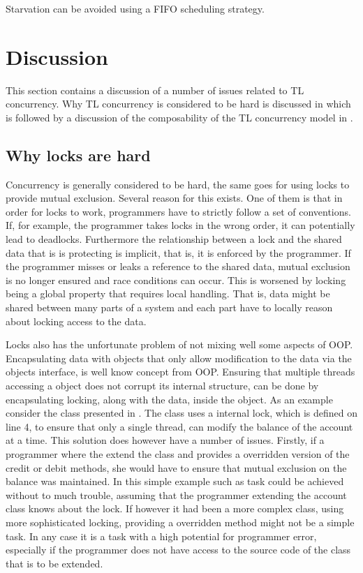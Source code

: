 Starvation can be avoided using a \ac{FIFO} scheduling strategy\cite[p. 459]{tanenbaum2008modern}.

\section{Discussion}
This section contains a discussion of a number of issues related to \ac{TL} concurrency. Why \ac{TL} concurrency is considered to be hard is discussed in  which is followed by a discussion of the composability of the \ac{TL} concurrency model in .
\subsection{Why locks are hard}\label{subsec:tl_lock_hard}
Concurrency is generally considered to be hard, the same goes for using locks to provide mutual exclusion\cite[p. 56]{sutter2005software}. Several reason for this exists. One of them is that in order for locks to work, programmers have to strictly follow a set of conventions. If, for example, the programmer takes locks in the wrong order, it can potentially lead to deadlocks\cite[p. 58]{sutter2005software}. Furthermore the relationship between a lock and the shared data that is is protecting is implicit, that is, it is enforced by the programmer. If the programmer misses or leaks a reference to the shared data, mutual exclusion is no longer ensured and race conditions can occur. This is worsened by locking being a global property that requires local handling. That is, data might be shared between many parts of a system and each part have to locally reason about locking access to the data.

Locks also has the unfortunate problem of not mixing well some aspects of \ac{OOP}. Encapsulating data with objects that only allow modification to the data via the objects interface, is well know concept from \ac{OOP}. Ensuring that multiple threads accessing a object does not corrupt its internal structure, can be done by encapsulating locking, along with the data, inside the object. As an example consider the  class presented in . The  class uses a internal lock, which is defined on line 4, to ensure that only a single thread, can modify the balance of the account at a time. This solution does however have a number of issues. Firstly, if a programmer where the extend the  class and provides a overridden version of the credit or debit methods, she would have to ensure that mutual exclusion on the balance was maintained. In this simple example such as task could be achieved without to much trouble, assuming that the programmer extending the account class knows about the lock. If however it had been a more complex class, using more sophisticated locking, providing a overridden method might not be a simple task. In any case it is a task with a high potential for programmer error, especially if the programmer does not have access to the source code of the class that is to be extended.

